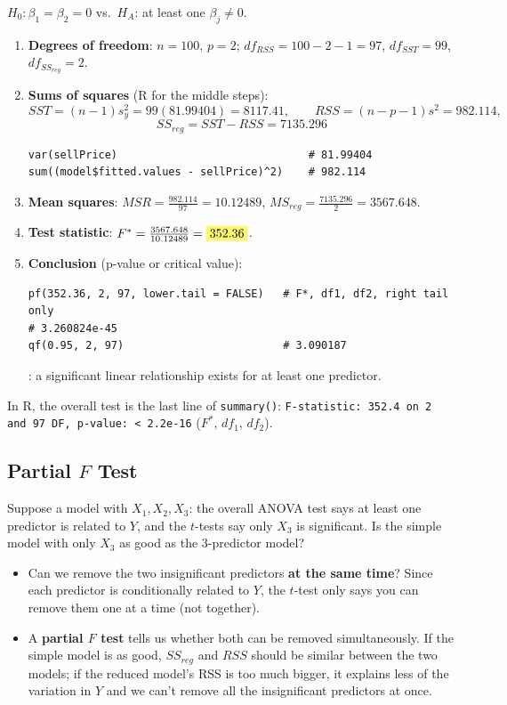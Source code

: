 \begin{example}
    $H_0:\beta_1=\beta_2=0$ vs.\ $H_A$: at least one $\beta_j\neq0$.
    \begin{enumerate}
        \item \textbf{Degrees of freedom}: $n=100$, $p=2$; $df_{RSS}=100-2-1=97$, $df_{SST}=99$, $df_{SS_{reg}}=2$.
        \item \textbf{Sums of squares} (R for the middle steps):
        \[SST=(n-1)s_y^2=99(81.99404)=8117.41,\qquad RSS=(n-p-1)s^2=982.114,\]
        \[SS_{reg}=SST-RSS=7135.296\]
\begin{verbatim}
var(sellPrice)                              # 81.99404
sum((model$fitted.values - sellPrice)^2)    # 982.114
\end{verbatim}
        \item \textbf{Mean squares}: $MSR=\frac{982.114}{97}=10.12489$, $MS_{reg}=\frac{7135.296}{2}=3567.648$.
        \item \textbf{Test statistic}: $F^*=\frac{3567.648}{10.12489}=\hlt{352.36}$.
        \item \textbf{Conclusion} (p-value or critical value):
\begin{verbatim}
pf(352.36, 2, 97, lower.tail = FALSE)   # F*, df1, df2, right tail only
# 3.260824e-45
qf(0.95, 2, 97)                         # 3.090187
\end{verbatim}
        : a significant linear relationship exists for at least one predictor.
    \end{enumerate}
    In R, the overall test is the last line of \texttt{summary()}:
    \texttt{F-statistic: 352.4 on 2 and 97 DF, p-value: < 2.2e-16} ($F^*$, $df_1$, $df_2$).
\end{example}

\subsection{Partial $F$ Test}

\begin{remark}
    Suppose a model with $X_1,X_2,X_3$: the overall ANOVA test says at least one predictor is
    related to $Y$, and the $t$-tests say only $X_3$ is significant. Is the simple model with
    only $X_3$ as good as the 3-predictor model?
    \begin{itemize}
        \item Can we remove the two insignificant predictors \textbf{at the same time}? Since each
        predictor is conditionally related to $Y$, the $t$-test only says you can remove them
        one at a time (not together).
        \item A \textbf{partial $F$ test} tells us whether both can be removed simultaneously.
        If the simple model is as good, $SS_{reg}$ and $RSS$ should be similar between the two
        models; if the reduced model's RSS is too much bigger, it explains less of the variation
        in $Y$ and we can't remove all the insignificant predictors at once.
    \end{itemize}
\end{remark}

